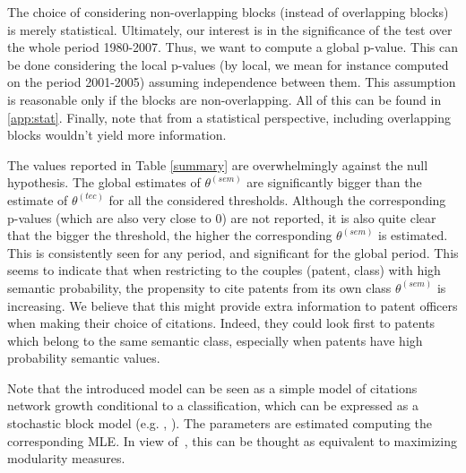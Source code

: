 \documentclass[article]{article}%
\begin{document}
The choice of considering non-overlapping blocks (instead of overlapping blocks) is merely statistical. Ultimately, our interest is in the significance of the test over the whole period 1980-2007. Thus, we want to compute a global p-value. This can be done considering the local p-values (by local, we mean for instance computed on the period 2001-2005) assuming independence between them. This assumption is reasonable only if the blocks are non-overlapping. All of this can be found in \ref{app:stat}. Finally, note that from a statistical perspective, including overlapping blocks wouldn't yield more information.

The values reported in Table \ref{summary} are overwhelmingly against the null hypothesis. The global estimates of $\theta^{(sem)}$ are significantly bigger than the estimate of $\theta^{(tec)}$ for all the considered thresholds. Although the corresponding p-values (which are also very close to 0) are not reported, it is also quite clear that the bigger the threshold, the higher the corresponding $\theta^{(sem)}$ is estimated. This is consistently seen for any period, and significant for the global period. This seems to indicate that when restricting to the couples (patent, class) with high semantic probability, the propensity to cite patents from its own class $\theta^{(sem)}$ is increasing. We believe that this might provide extra information to patent officers when making their choice of citations. Indeed, they could look first to patents which belong to the same semantic class, especially when patents have high probability semantic values.  

Note that the introduced model can be seen as a simple model of citations network growth conditional to a classification, which can be expressed as a stochastic block model (e.g. \citealt{decelle2011asymptotic}, \citealt{valles2016multilayer}). The parameters are estimated computing the corresponding MLE. In view of~\citet{2016arXiv160602319N}, this can be thought as equivalent to maximizing modularity measures.
\end{document}
